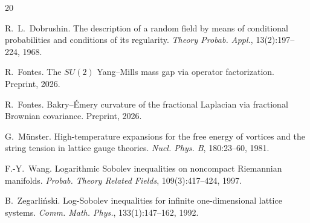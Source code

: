 \documentclass[11pt,a4paper]{article}
\theoremstyle{plain}
\theoremstyle{definition}
\theoremstyle{remark}
\begin{document}
\begin{thebibliography}{20}

R.~L.~Dobrushin.
\newblock The description of a random field by means of conditional
  probabilities and conditions of its regularity.
\newblock \emph{Theory Probab. Appl.}, 13(2):197--224, 1968.

R.~Fontes.
\newblock The $SU(2)$ Yang--Mills mass gap via operator factorization.
\newblock Preprint, 2026.

R.~Fontes.
\newblock Bakry--\'Emery curvature of the fractional {L}aplacian via
  fractional {B}rownian covariance.
\newblock Preprint, 2026.

G.~M\"unster.
\newblock High-temperature expansions for the free energy of vortices
  and the string tension in lattice gauge theories.
\newblock \emph{Nucl. Phys. B}, 180:23--60, 1981.

F.-Y.~Wang.
\newblock Logarithmic {S}obolev inequalities on noncompact
  {R}iemannian manifolds.
\newblock \emph{Probab. Theory Related Fields}, 109(3):417--424, 1997.

B.~Zegarli\'nski.
\newblock Log-{S}obolev inequalities for infinite one-dimensional
  lattice systems.
\newblock \emph{Comm. Math. Phys.}, 133(1):147--162, 1992.

\end{thebibliography}
\end{document}
